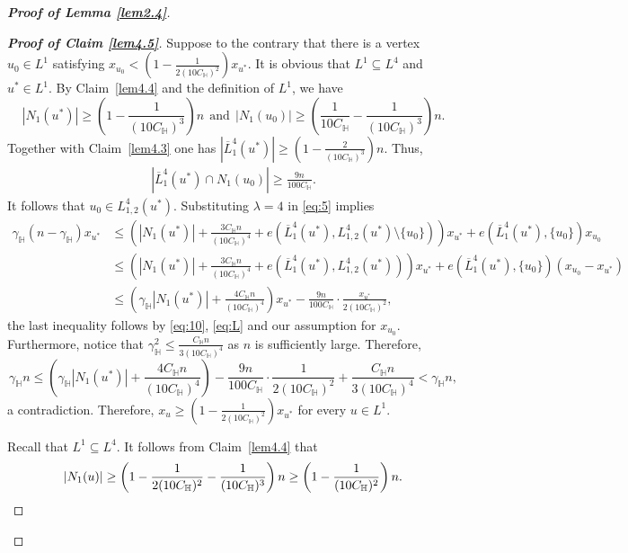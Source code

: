 \documentclass[11pt, a4paper]{article}
\theoremstyle{definition}
\newcommand{\<}{\subseteq}
\begin{document}
\begin{proof}[\bf Proof of Lemma \ref{lem2.4}]
\begin{proof}[\bf Proof of Claim \ref{lem4.5}]
    Suppose to the contrary that  there is a vertex \( u_0 \in L^1 \) satisfying \( x_{u_0} < \left(1-\frac{1}{2(10C_\mathbb{H})^2}\right)x_{u^*} \). It is obvious that $L^1\subseteq L^4$ and $u^*\in L^1$.  By Claim~\ref{lem4.4} and the definition of \( L^1 \), we have
    \[
    |N_1(u^*)| \geq \left(1-\frac{1}{(10C_\mathbb{H})^3}\right)n\ \ \text{and}\ \ 
    |N_1(u_0)| \geq \left(\frac{1}{10C_\mathbb{H}} - \frac{1}{(10C_\mathbb{H})^3}\right)n.
    \]
    Together with Claim~\ref{lem4.3} one has $|\overline{L}_1^4(u^*)| \geq \left(1 - \frac{2}{(10C_\mathbb{H})^3}\right)n$. Thus, 
    \begin{align}\label{eq:L}
        |\overline{L}_1^4(u^*) \cap N_1(u_0)| \geq \frac{9n}{100C_\mathbb{H}}.
    \end{align}
It follows that \( u_0 \in L_{1,2}^4(u^*) \). Substituting \( \lambda = 4 \) in \eqref{eq:5} implies\allowdisplaybreaks
\begin{align*}
    \gamma_\mathbb{H}(n-\gamma_\mathbb{H})x_{u^*} &\leq \left(|N_1({u^*})| +  \frac{3C_\mathbb{H}n}{(10C_\mathbb{H})^{4}} +e\left(\overline{L}_1^4(u^*), L_{1,2}^4(u^*)\setminus \{u_0\}\right) \right)x_{u^*}+e\left(\overline{L}_1^4(u^*), \{u_0\}\right)x_{u_0} \\
    &\leq \left(|N_1({u^*})| +  \frac{3C_\mathbb{H}n}{(10C_\mathbb{H})^{4}} +e\left(\overline{L}_1^4(u^*), L_{1,2}^4(u^*)\right) \right)x_{u^*}+e\left(\overline{L}_1^4(u^*), \{u_0\}\right)(x_{u_0}-x_{u^*})\\
    &\leq 
    \left(\gamma_\mathbb{H}|N_1({u^*})| +  \frac{4C_\mathbb{H}n}{(10C_\mathbb{H})^{4}}\right)x_{u^*}-\frac{9n}{100C_\mathbb{H}}\cdot \frac{x_{u^*}}{2(10C_{\mathbb{H}})^2},
\end{align*}
the last inequality follows by  \eqref{eq:10}, \eqref{eq:L} and our assumption for $x_{u_0}$. Furthermore, notice that $\gamma_{\mathbb{H}}^2\leq \frac{C_{\mathbb{H}}n}{3(10C_{\mathbb{H}})^4}$ as $n$ is sufficiently large. Therefore,
$$
\gamma_\mathbb{H}n \leq \left(\gamma_\mathbb{H}|N_1({u^*})| +  \frac{4C_\mathbb{H}n}{(10C_\mathbb{H})^{4}}\right)-\frac{9n}{100C_\mathbb{H}}\cdot \frac{1}{2(10C_{\mathbb{H}})^2}+\frac{C_{\mathbb{H}}n}{3(10C_{\mathbb{H}})^4}<\gamma_{\mathbb{H}} n,
$$
a contradiction. 
    Therefore,  \( x_u \geq \left(1-\frac{1}{2(10C_\mathbb{H})^2}\right)x_{u^*} \) for every $u\in L^1$. 
    
    Recall that $L^1\subseteq L^4$. It follows from Claim~\ref{lem4.4} that %
    \[
    |N_1(u)| \geq \left(1 - \frac{1}{2(10C_\mathbb{H})^2} - \frac{1}{(10C_\mathbb{H})^3}\right)n \geq \left(1 - \frac{1}{(10C_\mathbb{H})^2}\right)n.\qedhere
    \]
\end{proof}


\end{proof}
\end{document}
